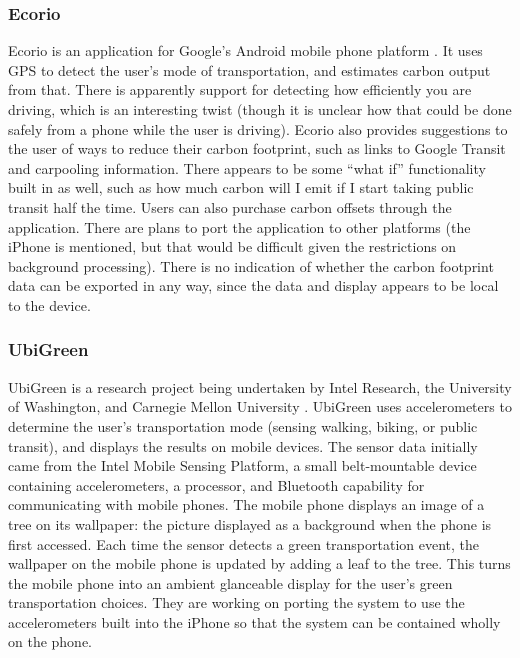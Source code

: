 \subsubsection{Ecorio}

Ecorio is an application for Google's Android mobile phone platform \cite{Ecorio-website}. It uses GPS to detect the user's mode of transportation, and estimates carbon output from that. There is apparently support for detecting how efficiently you are driving, which is an interesting twist (though it is unclear how that could be done safely from a phone while the user is driving). Ecorio also provides suggestions to the user of ways to reduce their carbon footprint, such as links to Google Transit and carpooling information. There appears to be some ``what if'' functionality built in as well, such as how much carbon will I emit if I start taking public transit half the time. Users can also purchase carbon offsets through the application. There are plans to port the application to other platforms (the iPhone is mentioned, but that would be difficult given the restrictions on background processing). There is no indication of whether the carbon footprint data can be exported in any way, since the data and display appears to be local to the device.

\subsubsection{UbiGreen}
\label{ubigreen}

UbiGreen is a research project being undertaken by Intel Research, the University of Washington, and Carnegie Mellon University \cite{ubigreen-website}. UbiGreen uses accelerometers to determine the user's transportation mode (sensing walking, biking, or public transit), and displays the results on mobile devices. The sensor data initially came from the Intel Mobile Sensing Platform, a small belt-mountable device containing accelerometers, a processor, and Bluetooth capability for communicating with mobile phones. The mobile phone displays an image of a tree on its wallpaper: the picture displayed as a background when the phone is first accessed. Each time the sensor detects a green transportation event, the wallpaper on the mobile phone is updated by adding a leaf to the tree. This turns the mobile phone into an ambient glanceable display for the user's green transportation choices. They are working on porting the system to use the accelerometers built into the iPhone so that the system can be contained wholly on the phone.

